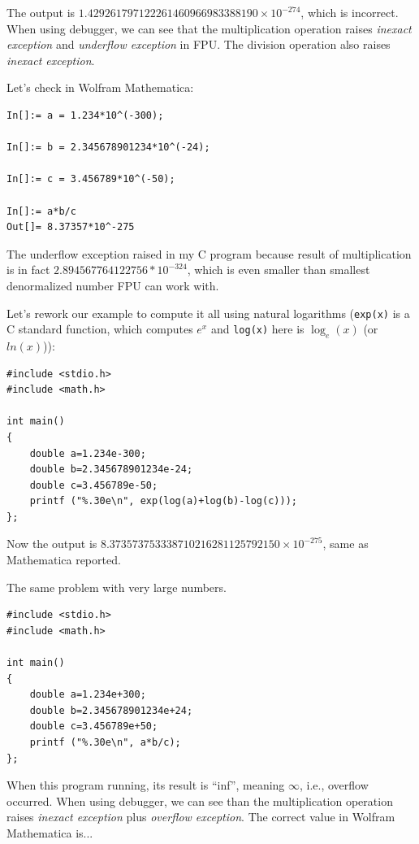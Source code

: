 The output is $1.429261797122261460966983388190 \times 10^{-274}$, which is incorrect.
When using debugger, we can see that the multiplication operation raises \textit{inexact exception} and \textit{underflow exception} in FPU.
The division operation also raises \textit{inexact exception}.

Let's check in Wolfram Mathematica:

\begin{lstlisting}[caption=Wolfram Mathematica]
In[]:= a = 1.234*10^(-300);

In[]:= b = 2.345678901234*10^(-24);

In[]:= c = 3.456789*10^(-50);

In[]:= a*b/c
Out[]= 8.37357*10^-275
\end{lstlisting}

The underflow exception raised in my C program because result of multiplication is in fact 
$2.894567764122756*10^{-324}$, which is even smaller than smallest denormalized number FPU can work with.

Let's rework our example to compute it all using natural logarithms 
(\texttt{exp(x)} is a C standard function, which computes $e^x$ and \texttt{log(x)} here is $\log_e(x)$ (or $ln(x)$)):

\begin{lstlisting}[caption=C code]
#include <stdio.h>
#include <math.h>

int main()
{
	double a=1.234e-300;
	double b=2.345678901234e-24;
	double c=3.456789e-50;
	printf ("%.30e\n", exp(log(a)+log(b)-log(c)));
};
\end{lstlisting}

Now the output is $8.373573753338710216281125792150 \times 10^{-275}$, same as Mathematica reported.

The same problem with very large numbers.

\begin{lstlisting}[caption=C code]
#include <stdio.h>
#include <math.h>

int main()
{
	double a=1.234e+300;
	double b=2.345678901234e+24;
	double c=3.456789e+50;
	printf ("%.30e\n", a*b/c);
};
\end{lstlisting}

When this program running, its result is ``inf'', meaning $\infty$, i.e., overflow occurred.
When using debugger, we can see than the multiplication operation raises \textit{inexact exception} plus \textit{overflow exception}.
The correct value in Wolfram Mathematica is...

